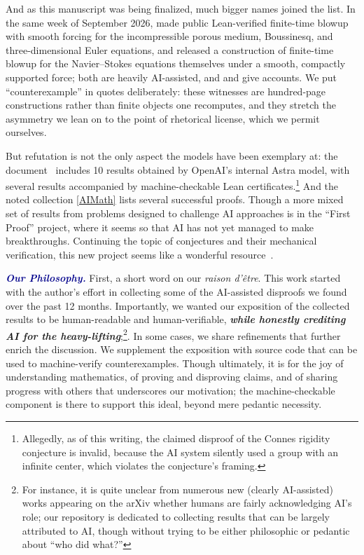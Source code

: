 \vskip5pt
\noindent And as this manuscript was being finalized, much bigger names joined the list. In the same week of September 2026, \citet{AlpogeBuckmaster2026} made public Lean-verified finite-time blowup with smooth forcing for the incompressible porous medium, Boussinesq, and three-dimensional Euler equations, and \citet{OpenAINavierStokes2026} released a construction of finite-time blowup for the Navier--Stokes equations themselves under a smooth, compactly supported force; both are heavily AI-assisted, and \citet{TaoBlowup2026} and \citet{KakaesNavierStokes2026} give accounts. We put ``counterexample'' in quotes deliberately: these witnesses are hundred-page constructions rather than finite objects one recomputes, and they stretch the asymmetry we lean on to the point of rhetorical license, which we permit ourselves.

\vskip5pt
But refutation is not the only aspect the models have been exemplary at: the document~\citep{OpenAITenAdvances2026}  includes 10 results obtained by OpenAI's internal Astra model, with several results accompanied by machine-checkable Lean certificates.\footnote{Allegedly, as of this writing, the claimed disproof of the Connes rigidity conjecture is invalid, because the AI system silently used a group with an infinite center, which violates the conjecture's framing.}
And the noted collection \href{https://aimath.robertj1.com}{[AIMath]} lists several successful proofs. Though a more mixed set of results from problems designed to challenge AI approaches is in the  ``First Proof'' \citep{abouzaid2026proof} project, where it seems so that AI has not yet managed to make breakthroughs. Continuing the topic of conjectures and their mechanical verification, this new project seems like a wonderful resource~\citep{FormalConjecturesPaper2026}.

\vskip5pt
\noindent\emph{\textbf{\textcolor{darkblue}{Our Philosophy.}}} First, a short word on our \emph{raison d'être}. This work started with the author's effort in collecting some of the AI-assisted disproofs we found over the past 12 months. Importantly, we  wanted our exposition of the collected results to be human-readable and human-verifiable, \textbf{\emph{while honestly crediting AI for the heavy-lifting}};\footnote{For instance, it is quite unclear from numerous new (clearly AI-assisted) works appearing on the arXiv whether humans are fairly acknowledging AI's role; our repository is dedicated to collecting results that can be largely attributed to AI, though without trying to be either philosophic or pedantic about ``who did what?''}. In some cases, we share refinements that further enrich the discussion. We supplement the exposition with source code that can be used to machine-verify counterexamples. Though ultimately, it is for the joy of understanding mathematics, of proving and disproving claims, and of sharing progress with others that underscores our motivation; the machine-checkable component is there to support this ideal, beyond mere pedantic necessity. 

